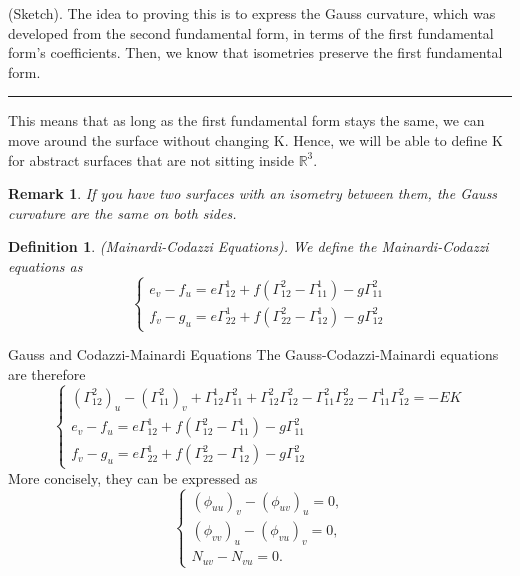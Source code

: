 \documentclass[twoside]{article}
\newtheorem{definition}[theorem]{Definition}
\newtheorem{remark}[theorem]{Remark}
\newenvironment{proof}{{\bf Proof:}}{\hfill\rule{2mm}{2mm}}
\begin{document}
\begin{proof}(Sketch). The idea to proving this is to express the Gauss curvature, which was developed from the second fundamental form, in terms of the first fundamental form's coefficients. Then, we know that isometries preserve the first fundamental form.
\end{proof}

This means that as long as the first fundamental form stays the same, we can move around the surface without changing K. Hence, we will be able to define K for abstract surfaces that are not sitting inside $\mathbb{R}^3.$

\begin{remark}If you have two surfaces with an isometry between them, the Gauss curvature are the same on both sides.
\end{remark}


\begin{definition}(Mainardi-Codazzi Equations). We define the Mainardi-Codazzi equations as 
$$
\begin{cases}
e_v - f_u = e\Gamma_{12}^{1} + f(\Gamma_{12}^{2} - \Gamma_{11}^{1}) - g\Gamma_{11}^{2} \\
f_v - g_u = e\Gamma_{22}^{1} + f(\Gamma_{22}^{2} - \Gamma_{12}^{1}) - g\Gamma_{12}^{2}
\end{cases}
$$
\end{definition}

\begin{definition_exam}{Gauss and Codazzi-Mainardi Equations}{} The Gauss-Codazzi-Mainardi equations are therefore 
$$
\begin{cases}
(\Gamma_{12}^{2})_u - (\Gamma_{11}^{2})_v + \Gamma_{12}^1\Gamma_{11}^2 + \Gamma_{12}^2\Gamma_{12}^2 - \Gamma_{11}^{2}\Gamma_{22}^{2} - \Gamma_{11}^{1}\Gamma_{12}^{2} = -EK\\
e_v - f_u = e\Gamma_{12}^{1} + f(\Gamma_{12}^{2} - \Gamma_{11}^{1}) - g\Gamma_{11}^{2} \\
f_v - g_u = e\Gamma_{22}^{1} + f(\Gamma_{22}^{2} - \Gamma_{12}^{1}) - g\Gamma_{12}^{2}
\end{cases}
$$
More concisely, they can be expressed as 
$$
\begin{cases}
(\phi_{uu})_{v} - (\phi_{uv})_{u} = 0,\\
(\phi_{vv})_{u} - (\phi_{vu})_{v} = 0,\\
N_{uv} - N_{vu} = 0.
\end{cases}
$$
\end{definition_exam}
\end{document}
